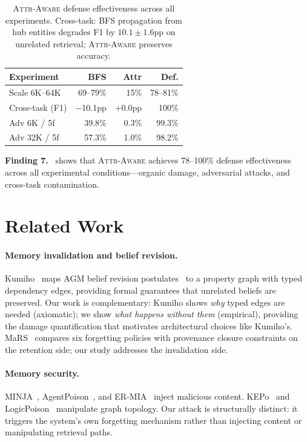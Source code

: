 \documentclass{article}
\newcommand{\attraware}{\textsc{Attr-Aware}}
\newcommand{\finding}[1]{\vspace{2pt}\noindent\textbf{Finding #1.}~}
\begin{document}
\begin{table}[htbp]
\centering
\footnotesize
\begin{tabular}{lrrr}
\toprule
\textbf{Experiment} & \textbf{BFS} & \textbf{Attr} & \textbf{Def.} \\
\midrule
Scale 6K--64K & 69--79\% & 15\% & 78--81\% \\
Cross-task (F1) & $-$10.1pp & +0.0pp & 100\% \\
Adv 6K / 5f & 39.8\% & 0.3\% & 99.3\% \\
Adv 32K / 5f & 57.3\% & 1.0\% & 98.2\% \\
\bottomrule
\end{tabular}
\caption{\attraware{} defense effectiveness across all experiments. Cross-task: BFS propagation from hub entities degrades F1 by $10.1\pm1.6$pp on unrelated retrieval; \attraware{} preserves accuracy.}
\label{tab:defense_all}
\end{table}

\finding{7}  shows that \attraware{} achieves 78--100\% defense effectiveness across all experimental conditions---organic damage, adversarial attacks, and cross-task contamination.


\section{Related Work}
\label{sec:related}

\paragraph{Memory invalidation and belief revision.}
Kumiho~\citep{kumiho_2026} maps AGM belief revision postulates~\citep{agm_1985} to a property graph with typed dependency edges, providing formal guarantees that unrelated beliefs are preserved.
Our work is complementary: Kumiho shows \textit{why} typed edges are needed (axiomatic); we show \textit{what happens without them} (empirical), providing the damage quantification that motivates architectural choices like Kumiho's.
MaRS~\citep{mars_2025} compares six forgetting policies with provenance closure constraints on the retention side; our study addresses the invalidation side.

\paragraph{Memory security.}
MINJA~\citep{minja_2025}, AgentPoison~\citep{agentpoison_2024}, and ER-MIA~\citep{ermia_2026} inject malicious content.
KEPo~\citep{kepo_2026} and LogicPoison~\citep{logicpoison_2026} manipulate graph topology.
Our attack is structurally distinct: it triggers the system's own forgetting mechanism rather than injecting content or manipulating retrieval paths.
\end{document}
